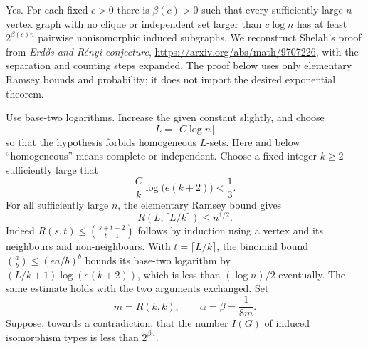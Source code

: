 Yes. For each fixed $c>0$ there is $\beta(c)>0$ such that every sufficiently large $n$-vertex graph with no clique or independent set larger than $c\log n$ has at least $2^{\beta(c)n}$ pairwise nonisomorphic induced subgraphs. We reconstruct Shelah's proof from \emph{Erd\H{o}s and R\'enyi conjecture}, \url{https://arxiv.org/abs/math/9707226}, with the separation and counting steps expanded. The proof below uses only elementary Ramsey bounds and probability; it does not import the desired exponential theorem.

Use base-two logarithms. Increase the given constant slightly, and choose
\[
 L=\lceil C\log n\rceil
\]
so that the hypothesis forbids homogeneous $L$-sets. Here and below ``homogeneous'' means complete or independent. Choose a fixed integer $k\ge2$ sufficiently large that
\[
 \frac Ck\log\bigl(e(k+2)\bigr)<\frac13.
\]
For all sufficiently large $n$, the elementary Ramsey bound gives
\[
 R(L,\lceil L/k\rceil)\le n^{1/2}.\tag{1}
\]
Indeed $R(s,t)\le\binom{s+t-2}{t-1}$ follows by induction using a vertex and its neighbours and non-neighbours. With $t=\lceil L/k\rceil$, the binomial bound $\binom ab\le(ea/b)^b$ bounds its base-two logarithm by $(L/k+1)\log(e(k+2))$, which is less than $(\log n)/2$ eventually. The same estimate holds with the two arguments exchanged. Set
\[
 m=R(k,k),\qquad \alpha=\beta=\frac1{8m}.
\]
Suppose, towards a contradiction, that the number $I(G)$ of induced isomorphism types is less than $2^{\beta n}$.
